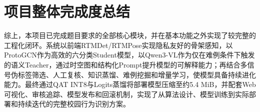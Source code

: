 \section{项目整体完成度总结}

综上，本项目已完成题目要求的全部核心模块，并在基本功能之外实现了较完整的工程化闭环。系统以前端RTMDet/RTMPose实现隐私友好的骨架感知，以ProtoGCN作为高效的六分类Student模型，以Qwen3-VL作为仅在难例条件下触发的语义Teacher，通过时空图和结构化Prompt提升模型的可解释能力；再结合多信号伪标签筛选、人工复核、知识蒸馏、难例挖掘和增量学习，使模型具备持续进化能力。最终通过QAT INT8与Logits蒸馏将部署模型压缩至约5.4 MiB，并配套Web可视化、审核追踪、模型发布和回滚机制，实现了从算法设计、模型训练到实际部署和持续迭代的完整校园行为识别方案。

